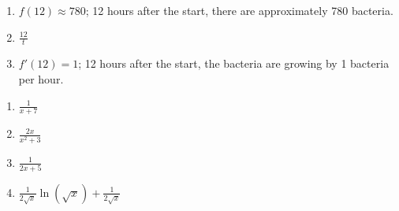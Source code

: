 \documentclass{article}
\newcounter{key}
\begin{document}
\begin{enumerate}   \setcounter{enumi}{\value{key}}
    \item $f(12) \approx 780$; 12 hours after the start, there are approximately 780 bacteria.
    \item $\frac{12}{t}$
    \item $f'(12) = 1$; 12 hours after the start, the bacteria are growing by 1 bacteria per hour.
\end{enumerate}     \setcounter{key}{\value{enumi}}

\begin{multicols}{4}
\begin{enumerate}   \setcounter{enumi}{\value{key}}
    \item $\frac{1}{x+7}$
    \item $\frac{2x}{x^2+3}$
    \item $\frac{1}{2x+5}$
    \item $\frac{1}{2\sqrt{x}}\ln(\sqrt{x}) + \frac{1}{2\sqrt{x}}$
\end{enumerate}     \setcounter{key}{\value{enumi}}
\end{multicols}
\end{document}
